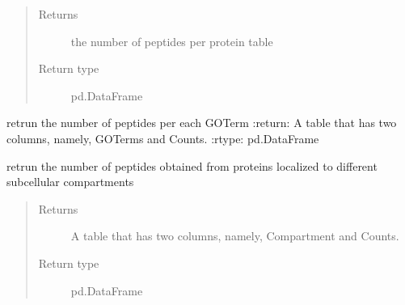\documentclass[letterpaper,10pt,english]{sphinxmanual}
\begin{document}
\begin{fulllineitems}
\begin{fulllineitems}
\begin{description}
\end{description}
\begin{quote}\begin{description}
\item[{Returns}] \leavevmode
the number of peptides per protein table

\item[{Return type}] \leavevmode
pd.DataFrame

\end{description}\end{quote}

\end{fulllineitems}


\begin{fulllineitems}
\label{\detokenize{IPTK.Classes:IPTK.Classes.Experiment.Experiment.get_num_peptide_per_go_term}}
retrun the number of peptides per each GO\sphinxhyphen{}Term 
:return: A table that has two columns, namely, GO\sphinxhyphen{}Terms and Counts. 
:rtype: pd.DataFrame

\end{fulllineitems}


\begin{fulllineitems}
\label{\detokenize{IPTK.Classes:IPTK.Classes.Experiment.Experiment.get_num_peptide_per_location}}
retrun the number of peptides obtained from proteins localized to different sub\sphinxhyphen{}cellular compartments
\begin{quote}\begin{description}
\item[{Returns}] \leavevmode
A table that has two columns, namely, Compartment and Counts.

\item[{Return type}] \leavevmode
pd.DataFrame


\end{description}
\end{quote}
\end{fulllineitems}
\end{fulllineitems}
\end{document}
